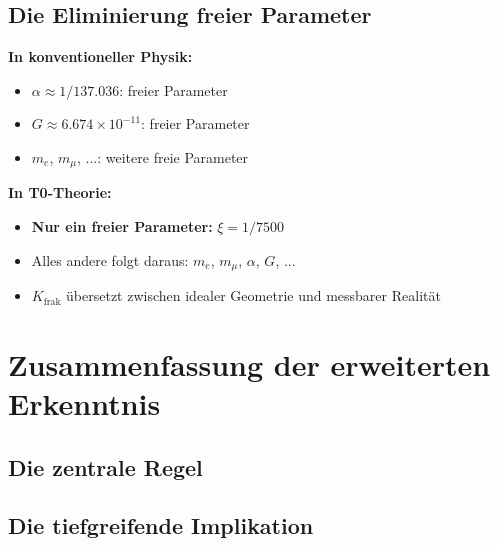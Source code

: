 \documentclass[12pt,a4paper]{article}
\begin{document}
	\subsection{Die Eliminierung freier Parameter}
	
	\textbf{In konventioneller Physik:}
	\begin{itemize}
		\item $\alpha \approx 1/137.036$: freier Parameter
		\item $G \approx 6.674\times10^{-11}$: freier Parameter  
		\item $m_e$, $m_μ$, ...: weitere freie Parameter
	\end{itemize}
	
	\textbf{In T0-Theorie:}
	\begin{itemize}
		\item \textbf{Nur ein freier Parameter:} $\xi = 1/7500$
		\item Alles andere folgt daraus: $m_e$, $m_μ$, $\alpha$, $G$, ...
		\item $K_{\text{frak}}$ übersetzt zwischen idealer Geometrie und messbarer Realität
	\end{itemize}
	
	\section{Zusammenfassung der erweiterten Erkenntnis}
	
	\subsection{Die zentrale Regel}
	
	\begin{center}
	\end{center}
	
	\subsection{Die tiefgreifende Implikation}
	
	\begin{center}
	\end{center}
	
\end{document}
